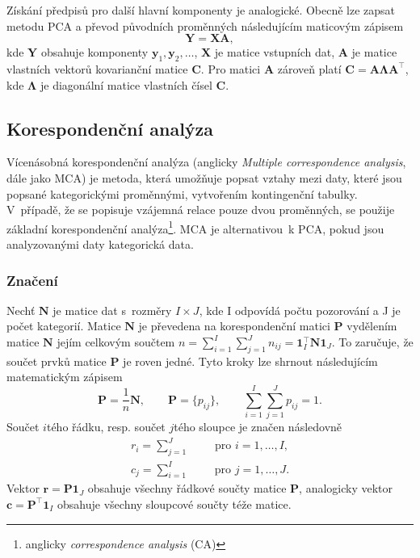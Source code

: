 Získání předpisů pro další hlavní komponenty je analogické. Obecně lze zapsat metodu PCA a převod původních proměnných následujícím maticovým zápisem
\begin{equation}
    \mathbf{Y} = \mathbf{XA}, 
\end{equation}
kde $\mathbf{Y}$ obsahuje komponenty $\bm{y}_{1}, \bm{y}_{2}, \ldots$, $\mathbf{X}$ je matice vstupních dat, $\mathbf{A}$ je matice vlastních vektorů kovarianční matice $\mathbf{C}$. Pro matici $\mathbf{A}$ zároveň platí $\mathbf{C} =  \mathbf{A} \mathbf{\Lambda} \mathbf{A}^\top$, kde $\mathbf{\Lambda}$ je diagonální matice vlastních čísel $\mathbf{C}$.\cite{bib:PCA2}

\subsection{Korespondenční analýza}

Vícenásobná korespondenční analýza (anglicky \emph{Multiple correspondence analysis}, dále jako MCA) je metoda, která umožňuje popsat vztahy mezi daty, které jsou popsané kategorickými proměnnými, vytvořením kontingenční tabulky. V~případě, že se popisuje vzájemná relace pouze dvou proměnných, se použije základní korespondenční analýza\footnote{anglicky \emph{correspondence analysis} (CA)}. MCA je alternativou~k PCA, pokud jsou analyzovanými daty kategorická data. \cite{bib:MCA1}

\subsubsection{Značení}
Nechť $\mathbf{N}$ je matice dat s~rozměry $I\times J$, kde I odpovídá počtu pozorování a J je počet kategorií. %
Matice $\mathbf{N}$ je převedena na korespondenční matici $\mathbf{P}$ vydělením matice $\mathbf{N}$ jejím celkovým součtem $n = \sum_{i=1}^{I} \sum_{j=1}^{J} n_{ij}=\mathbf{1}^\top_I \mathbf{N}\mathbf{1}_J$. To zaručuje, že součet prvků matice $\mathbf{P}$ je roven jedné. Tyto kroky lze shrnout následujícím matematickým zápisem
\begin{equation}
    \mathbf{P} = \frac{1}{n}\mathbf{N}, \qquad \mathbf{P} = \{p_{ij}\},  \qquad  \sum_{i=1}^{I} \sum_{j=1}^{J} p_{ij} = 1.
\end{equation}
Součet $i$tého řádku, resp. součet $j$tého sloupce je značen následovně
\begin{align*}
    r_i = \sum_{j=1}^{J} \qquad \mbox{ pro } i=1,\ldots,I, \\
    c_j = \sum_{i=1}^{I} \qquad \mbox{ pro } j=1,\ldots,J.
\end{align*}
Vektor $\bm{r} = \mathbf{P} \mathbf{1}_J $ obsahuje všechny řádkové součty matice $\mathbf{P}$, analogicky vektor $\bm{c} = \mathbf{P}^\top \mathbf{1}_I $ obsahuje všechny sloupcové součty téže matice.

